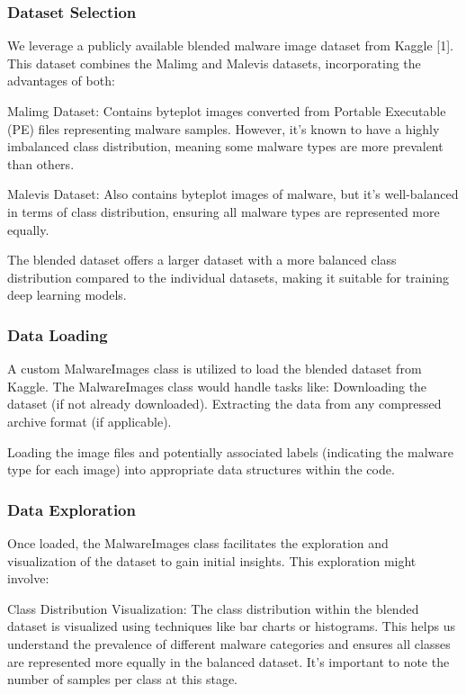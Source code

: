 \documentclass[conference]{IEEEtran}
\begin{document}
\subsubsection{Dataset Selection}

    We leverage a publicly available blended malware image dataset from Kaggle [1]. This dataset combines the Malimg and Malevis datasets, incorporating the advantages of both:
    
        Malimg Dataset: Contains byteplot images converted from Portable Executable (PE) files representing malware samples. However, it's known to have a highly imbalanced class distribution, meaning some malware types are more prevalent than others.
        
        Malevis Dataset: Also contains byteplot images of malware, but it's well-balanced in terms of class distribution, ensuring all malware types are represented more equally.
        
    The blended dataset offers a larger dataset with a more balanced class distribution compared to the individual datasets, making it suitable for training deep learning models.

\subsubsection{Data Loading}

    A custom MalwareImages class is utilized to load the blended dataset from Kaggle. 
    The MalwareImages class would handle tasks like:
        Downloading the dataset (if not already downloaded).
        Extracting the data from any compressed archive format (if applicable).

        Loading the image files and potentially associated labels (indicating the malware type for each image) into appropriate data structures within the code.

\subsubsection{Data Exploration}

    Once loaded, the MalwareImages class facilitates the exploration and visualization of the dataset to gain initial insights. This exploration might involve:
    
        Class Distribution Visualization: The class distribution within the blended dataset is visualized using techniques like bar charts or histograms. This helps us understand the prevalence of different malware categories and ensures all classes are represented more equally in the balanced dataset. It's important to note the number of samples per class at this stage.
        
\end{document}
